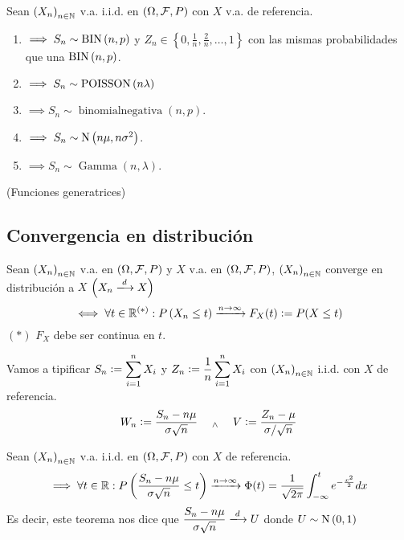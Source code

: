 Sean $\left(X_n\right)_{n\in \mathbb{N}}$ v.a. i.i.d. en $(\Omega, \mathcal{F}, P)$ con $X$ v.a. de referencia.
\begin{enumerate}
	\item {} $\implies S_n \sim \operatorname{BIN}\left(n,p\right)$ y $Z_n \in \left\{0, \frac{1}{n}, \frac{2}{n}, \dots, 1\right\}$ con las mismas probabilidades que una $\operatorname{BIN}\left(n,p\right)$.
	\item {} $\implies S_n \sim \operatorname{POISSON}\left(n\lambda\right)$
	\item {} $\implies S_n \sim \operatorname{binomial negativa}(n,p)$.
	\item {} $\implies S_n \sim \operatorname{N}\left(n\mu, n\sigma^2\right)$.
	\item {} $\implies S_n \sim \operatorname{Gamma}(n,\lambda)$.
\end{enumerate}

 (Funciones generatrices)


\subsection{Convergencia en distribución}

\begin{defn}
	Sean $\left(X_n\right)_{n\in \mathbb{N}}$ v.a. en $(\Omega, \mathcal{F}, P)$ y $X$ v.a. en $(\Omega, \mathcal{F}, P)$, $\left(X_n\right)_{n\in \mathbb{N}}$ {converge en distribución} a $X$ $\left(X_n \xlongrightarrow{d} X\right)$
	\[\iff \forall t \in \mathbb{R}^{(*)} : P\left(X_n \leq t\right) \xrightarrow{n\to\infty} F_X(t) \vcentcolon= P(X \leq t)\]
	\hspace*{\fill} $(*)$ $F_X$ debe ser continua en $t$.
\end{defn}

Vamos a tipificar $\displaystyle S_n\vcentcolon= \sum_{i=1}^{n} X_i$ y $\displaystyle Z_n \vcentcolon= \frac{1}{n}\sum_{i=1}^{n} X_i$ con $\left(X_n\right)_{n\in \mathbb{N}}$ i.i.d. con $X$ de referencia.
\[W_n \vcentcolon= \frac{S_n - n\mu}{\sigma \sqrt{n}} \quad \; _{\wedge} \; \quad V \vcentcolon= \frac{Z_n - \mu}{\sigma/\sqrt{n}}\]

\begin{teo}
	Sean $\left(X_n\right)_{n\in \mathbb{N}}$ v.a. i.i.d. en $(\Omega, \mathcal{F}, P)$ con $X$ de referencia.
	\[\implies \forall t \in \mathbb{R} : P\left(\frac{S_n - n\mu}{\sigma \sqrt{n}} \leq t\right) \xrightarrow{n\to\infty} \Phi(t) = \frac{1}{\sqrt{2\pi}}\int_{-\infty}^{t} e^{-\frac{x^2}{2}}dx\]
	Es decir, este teorema nos dice que $\ds \frac{S_n - n\mu}{\sigma \sqrt{n}} \xlongrightarrow{d} U$ donde $U\sim\operatorname{N}\left(0,1\right)$
	\begin{dem}

	\end{dem}
\end{teo}

